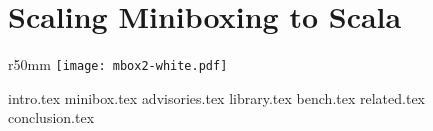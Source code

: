 \chapter{Scaling Miniboxing to Scala}
\label{chapter:mbox2}

\begin{wrapfigure}{r}{50mm}
  \centering
  \vspace{-30em}
  \texttt{[image: mbox2-white.pdf]}
  \vspace{-30em}
\end{wrapfigure}

{intro.tex}
{minibox.tex}
{advisories.tex}
{library.tex}
{bench.tex}
{related.tex}
{conclusion.tex}
